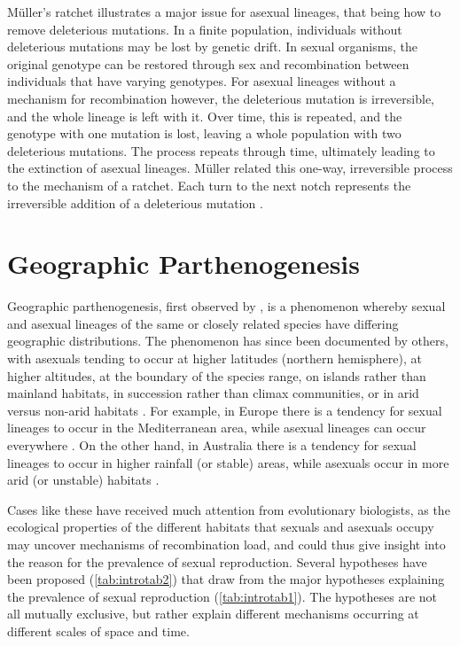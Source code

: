 \begin{infobox}
M\"uller's ratchet illustrates a major issue for asexual lineages, that being how to remove deleterious mutations. In a finite population, individuals without deleterious mutations may be lost by genetic drift. In sexual organisms, the original genotype can be restored through sex and recombination between individuals that have varying genotypes. For asexual lineages without a mechanism for recombination however, the deleterious mutation is irreversible, and the whole lineage is left with it. Over time, this is repeated, and the genotype with one mutation is lost, leaving a whole population with two deleterious mutations. The process repeats through time, ultimately leading to the extinction of asexual lineages. M\"uller related this one-way, irreversible process to the mechanism of a ratchet. Each turn to the next notch represents the irreversible addition of a deleterious mutation \parencite{muller_relation_1964}.
\label{ibx:muller}
\end{infobox}


\section{Geographic Parthenogenesis}
\begin{sloppypar}
Geographic parthenogenesis, first observed by \textcite{vandel_parthenogen`ese_1928,vandel_parthenogen`ese_1940}, is a phenomenon whereby sexual and asexual lineages of the same or closely related species have differing geographic distributions. The phenomenon has since been documented by others, with asexuals tending to occur at higher latitudes (northern hemisphere), at higher altitudes, at the boundary of the species range, on islands rather than mainland habitats, in succession rather than climax communities, or in arid versus non-arid habitats \parencite{glesener_sexuality_1978,bell_masterpiece_1982,lynch_destabilizing_1984,kearney_why_2003,parker_jr_geographic_2002}. For example, in Europe there is a tendency for sexual lineages to occur in the Mediterranean area, while asexual lineages can occur everywhere \parencite{vandel_parthenogen`ese_1928}. On the other hand, in Australia there is a tendency for sexual lineages to occur in higher rainfall (or stable) areas, while asexuals occur in more arid (or unstable) habitats \parencite{kearney_why_2003}.
\end{sloppypar}

Cases like these have received much attention from evolutionary biologists, as the ecological properties of the different habitats that sexuals and asexuals occupy may uncover mechanisms of recombination load, and could thus give insight into the reason for the prevalence of sexual reproduction. Several hypotheses have been proposed (\cref{tab:introtab2}) that draw from the major hypotheses explaining the prevalence of sexual reproduction (\cref{tab:introtab1}). The hypotheses are not all mutually exclusive, but rather explain different mechanisms occurring at different scales of space and time.

